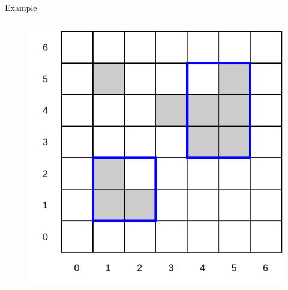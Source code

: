 \documentclass[10pt]{beamer}
\begin{document}
\begin{frame}{Example}
\begin{columns}[T, onlytextwidth]
        \begin{figure}
            \centering
            \includegraphics[scale=0.5]{figures/running-example/MDL/example-2.pdf}
        \end{figure}
    \end{columns}
\end{frame}
\end{document}
